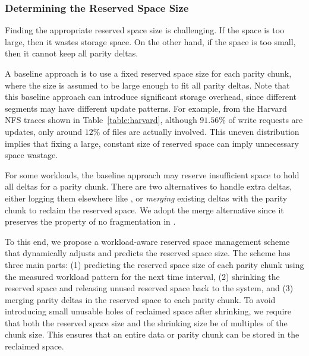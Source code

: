 \subsubsection{Determining the Reserved Space Size}
\label{sec:reserve_strategies}

Finding the appropriate reserved space size is challenging.  If the space is
too large, then it wastes storage space.   On the other hand, if the space is
too small, then it cannot keep all parity deltas.  




A baseline approach is to use a fixed reserved space size for each parity
chunk, where the size is assumed to be large enough to fit all parity deltas.  
Note that this baseline approach can introduce
significant storage overhead, since different segments may have different
update patterns.  For example, from the Harvard NFS traces shown in
Table~\ref{table:harvard}, although $91.56\%$ of write requests are updates,
only around $12\%$ of files are actually involved.  This uneven distribution
implies that fixing a large, constant size of reserved space can imply
unnecessary space wastage. 

For some workloads, the baseline approach may reserve insufficient space to
hold all deltas for a parity chunk. There are two alternatives to handle extra
deltas, either logging them elsewhere like \PL, or \textit{merging} existing
deltas with the parity chunk to reclaim the reserved space.  We adopt the
merge alternative since it preserves the property of no fragmentation in
\PLR.

To this end, we propose a workload-aware reserved space management scheme that
dynamically adjusts and predicts the reserved space size. The scheme has
three main parts: 
(1) predicting the reserved space size of each parity chunk 
using the measured workload pattern for the next time interval, 
(2) shrinking the reserved space and releasing unused reserved space back to 
the system, and
(3) merging parity deltas in the reserved space to each parity chunk.
To avoid introducing small unusable holes of reclaimed space after shrinking,
we require that both the reserved space size and the shrinking size be of
multiples of the chunk size.  This ensures that an entire data or parity chunk
can be stored in the reclaimed space. 

